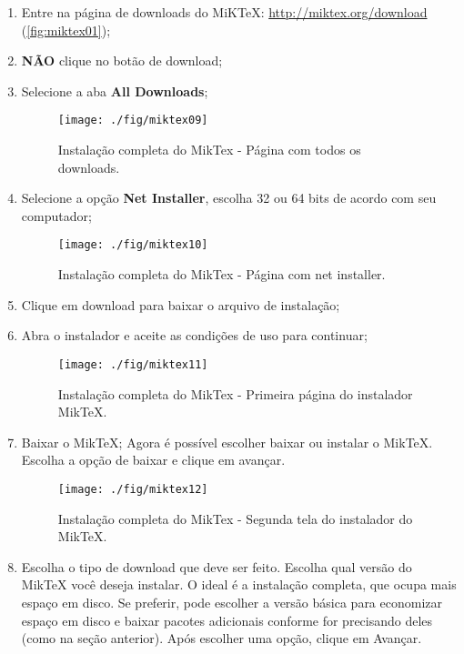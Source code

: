 \begin{enumerate}
\item Entre na página de downloads do MiKTeX: \url{http://miktex.org/download} (\autoref{fig:miktex01});
\item \textbf{NÃO} clique no botão de download;
\item Selecione a aba \textbf{All Downloads};
\begin{figure}[H]
  \centering
  \texttt{[image: ./fig/miktex09]}
  \caption[Página com todos os downloads]{Instalação completa do MikTex - Página com todos os downloads.}
\end{figure}
\item Selecione a opção \textbf{Net Installer}, escolha 32 ou 64 bits de acordo com seu computador;
\begin{figure}[H]
  \centering
  \texttt{[image: ./fig/miktex10]}
  \caption{Instalação  completa do MikTex - Página com net installer.}
\end{figure}
\item Clique em download para baixar o arquivo de instalação;
\item Abra o instalador e aceite as condições de uso para continuar;
\begin{figure}[H]
  \centering
  \texttt{[image: ./fig/miktex11]}
  \caption[Primeira página do instalador MikTeX]{Instalação completa do MikTex - Primeira página do instalador MikTeX.}
\end{figure}
\item Baixar o MikTeX;
Agora é possível escolher baixar ou instalar o MikTeX. Escolha a opção de baixar e clique em avançar.
\begin{figure}[H]
  \centering
  \texttt{[image: ./fig/miktex12]}
  \caption[Segunda tela do instalador do MikTeX]{Instalação completa do MikTex - Segunda tela do instalador do MikTeX.}
\end{figure}
\item Escolha o tipo de download que deve ser feito.
Escolha qual versão do MikTeX você deseja instalar. O ideal é a instalação completa, que ocupa mais espaço em disco. Se preferir, pode escolher a versão básica para economizar espaço em disco e baixar pacotes adicionais conforme for precisando deles (como na seção anterior). Após escolher uma opção, clique em Avançar.
\begin{figure}[H]

\end{figure}
\end{enumerate}
